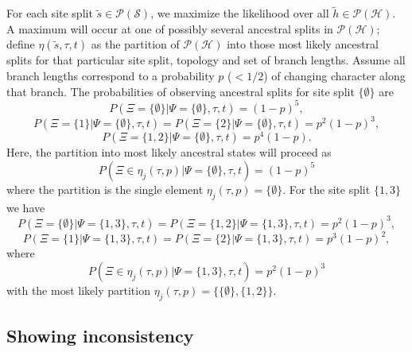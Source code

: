 \documentclass[a4paper]{article}
\newcommand{\siteSplit}{\tilde{s}}
\newcommand{\siteSplitSet}{\mathcal{S}}
\newcommand{\ancestralSplit}{\tilde{h}}
\newcommand{\ancestralSplitSet}{\mathcal{H}}
\newcommand{\ancestralSplitPartition}{\eta}
\newcommand{\siteSplitRV}{\Psi}
\newcommand{\ancestralSplitRV}{\Xi}
\begin{document}
For each site split $\siteSplit\in\mathcal{P}(\siteSplitSet)$, we maximize the likelihood over all $\ancestralSplit\in\mathcal{P}(\ancestralSplitSet)$.
A maximum will occur at one of possibly several ancestral splits in $\mathcal{P}(\ancestralSplitSet)$; define $\ancestralSplitPartition(\siteSplit, \tau, t)$ as the partition of $\mathcal{P}(\ancestralSplitSet)$ into those most likely ancestral splits for that particular site split, topology and set of branch lengths.
Assume all branch lengths correspond to a probability $p$ ($< 1/2$) of changing character along that branch.
The probabilities of observing ancestral splits for site split $\{\emptyset\}$ are 
$$
P(\ancestralSplitRV=\{\emptyset\}|\siteSplitRV=\{\emptyset\}, \tau, t) = 
(1-p)^5,
$$
$$
P(\ancestralSplitRV=\{1\}|\siteSplitRV=\{\emptyset\}, \tau, t) =
P(\ancestralSplitRV=\{2\}|\siteSplitRV=\{\emptyset\}, \tau, t) = 
p^2(1-p)^3,
$$
$$
P(\ancestralSplitRV=\{1,2\}|\siteSplitRV=\{\emptyset\}, \tau, t) = 
p^4(1-p).
$$
Here, the partition into most likely ancestral states will proceed as
$$
P(\ancestralSplitRV\in\ancestralSplitPartition_j(\tau, p)|\siteSplitRV=\{\emptyset\}, \tau, t) = 
(1-p)^5
$$
where the partition is the single element $\ancestralSplitPartition_j(\tau, p)=\{\emptyset\}$.
For the site split $\{1,3\}$ we have
$$
P(\ancestralSplitRV=\{\emptyset\}|\siteSplitRV=\{1,3\}, \tau, t) = 
P(\ancestralSplitRV=\{1,2\}|\siteSplitRV=\{1,3\}, \tau, t) =
p^2(1-p)^3,
$$
$$
P(\ancestralSplitRV=\{1\}|\siteSplitRV=\{1,3\}, \tau, t) = 
P(\ancestralSplitRV=\{2\}|\siteSplitRV=\{1,3\}, \tau, t) =
p^3(1-p)^2,
$$
where
$$
P(\ancestralSplitRV\in\ancestralSplitPartition_j(\tau, p)|\siteSplitRV=\{1,3\}, \tau, t) = 
p^2(1-p)^3
$$
with the most likely partition $\ancestralSplitPartition_j(\tau, p)=\{\{\emptyset\},\{1,2\}\}.$


\subsection{Showing inconsistency}
\end{document}
